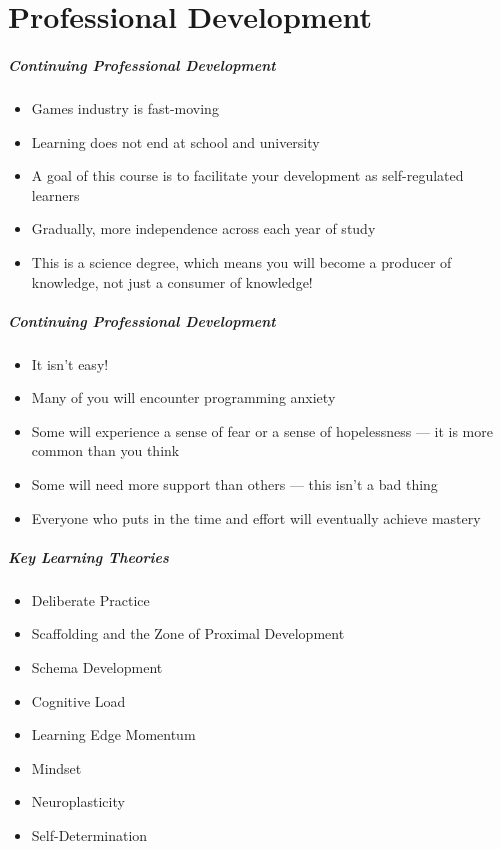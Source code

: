 \part{Professional Development}
\frame{\partpage}

\begin{frame}
	\frametitle{Continuing Professional Development}
	
	\begin{itemize}
		\item Games industry is fast-moving
		\item Learning does not end at school and university
		\item A goal of this course is to facilitate your development as self-regulated learners
		\item Gradually, more independence across each year of study
		\item This is a science degree, which means you will become a producer of knowledge, not just a consumer of knowledge!
	\end{itemize}
\end{frame}

\begin{frame}
	\frametitle{Continuing Professional Development}
	
	\begin{itemize}
		\item It isn't easy!
		\item Many of you will encounter programming anxiety
		\item Some will experience a sense of fear or a sense of hopelessness --- it is more common than you think
		\item Some will need more support than others --- this isn't a bad thing
		\item Everyone who puts in the time and effort will eventually achieve mastery
	\end{itemize}
\end{frame}

\begin{frame}
	\frametitle{Key Learning Theories}
	
	\begin{itemize}
		\item Deliberate Practice
		\item Scaffolding and the Zone of Proximal Development
		\item Schema Development
		\item Cognitive Load
		\item Learning Edge Momentum
		\item Mindset
		\item Neuroplasticity
		\item Self-Determination
	\end{itemize}
\end{frame}


